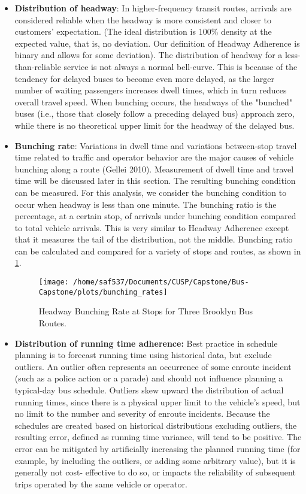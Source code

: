 \documentclass[12pt]{report}
\begin{document}
\begin{itemize}
\item \textbf{Distribution of headway}: In higher-frequency transit routes, arrivals are considered reliable when the headway is more consistent and closer to customers' expectation.  (The ideal distribution is 100\% density at the expected value, that is, no deviation.  Our definition of Headway Adherence is binary and allows for some deviation).  The distribution of headway for a less-than-reliable service is not always a normal bell-curve.  This is because of the tendency for delayed buses to become even more delayed, as the larger number of waiting passengers increases dwell times, which in turn reduces overall travel speed.  When bunching occurs, the headways of the "bunched" buses (i.e., those that closely follow a preceding delayed bus) approach zero, while there is no theoretical upper limit for the headway of the delayed bus.
\item \textbf{Bunching rate}: Variations in dwell time and variations between-stop travel time related to traffic and operator behavior are the major causes of vehicle bunching along a route (Gellei 2010).  Measurement of dwell time and travel time will be discussed later in this section.  The resulting bunching condition can be measured.  For this analysis, we consider the bunching condition to occur when headway is less than one minute.  The bunching ratio is the percentage, at a certain stop, of arrivals under bunching condition compared to total vehicle arrivals.  This is very similar to Headway Adherence except that it measures the tail of the distribution, not the middle.  Bunching ratio can be calculated and compared for a variety of stops and routes, as shown in \ref{bunch}.


\begin{figure}[!ht]
  \caption{Headway Bunching Rate at Stops for Three Brooklyn Bus Routes.}
  \label{bunch}
  \centering
    \texttt{[image: /home/saf537/Documents/CUSP/Capstone/Bus-Capstone/plots/bunching\_rates]}
\end{figure}



\item \textbf{Distribution of running time adherence:} Best practice in schedule planning is to forecast running time using historical data, but exclude outliers. An outlier often represents an occurrence of some enroute incident (such as a police action or a parade) and should not influence planning a typical-day bus schedule. Outliers skew upward the distribution of actual running times, since there is a physical upper limit to the vehicle's speed, but no limit to the number and severity of enroute incidents. Because the schedules are created based on historical distributions excluding outliers, the resulting error, defined as running time variance, will tend to be positive. The error can be mitigated by artificially increasing the planned running time (for example, by including the outliers, or adding some arbitrary value), but it is generally not cost- effective to do so, or impacts the reliability of subsequent trips operated by the same vehicle or operator.



\end{itemize}
\end{document}
